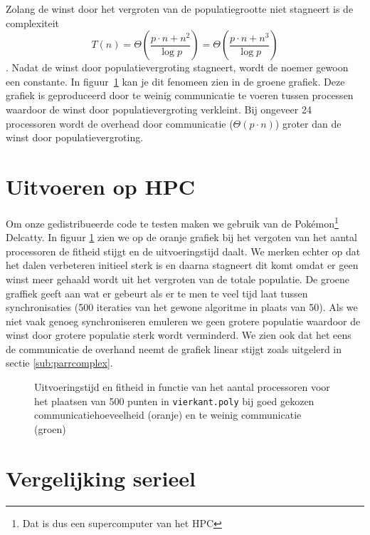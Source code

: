 Zolang de winst door het vergroten van de populatiegrootte niet stagneert is de complexiteit  \[T(n)=\Theta\left(\frac{p\cdot n + n^2}{\log{p}}\right) = \Theta\left(\frac{p\cdot n + n^3}{\log{p}}\right)\]. Nadat de winst door populatievergroting stagneert, wordt de noemer gewoon een constante. In figuur~\ref{delcaty} kan je dit fenomeen zien in de groene grafiek. Deze grafiek is geproduceerd door te weinig communicatie te voeren tussen processen waardoor de winst door populatievergroting verkleint. Bij ongeveer 24 processoren wordt de overhead door communicatie ($\Theta(p\cdot n)$) groter dan de winst door populatievergroting.

\section{Uitvoeren op HPC}
Om onze gedistribueerde code te testen maken we gebruik van de Pokémon\footnote{Dat is dus een supercomputer van het HPC} Delcatty. In figuur \ref{delcaty} zien we op de oranje grafiek bij het vergoten van het aantal processoren de fitheid stijgt en de uitvoeringstijd daalt. We merken echter op dat het dalen verbeteren initieel sterk is en daarna stagneert dit komt omdat er geen winst meer gehaald wordt uit het vergroten van de totale populatie. De groene graffiek geeft aan wat er gebeurt als er te men te veel tijd laat tussen synchronisaties (500 iteraties van het gewone algoritme in plaats van 50). Als we niet vaak genoeg synchroniseren emuleren we geen grotere populatie waardoor de winst door grotere populatie sterk wordt verminderd. We zien ook dat het eens de communicatie de overhand neemt de grafiek linear stijgt zoals uitgelerd in sectie \ref{sub:parrcomplex}.

\begin{figure}[H]


\caption{Uitvoeringstijd en fitheid in functie van het aantal processoren voor het plaatsen van 500 punten in \texttt{vierkant.poly} bij goed gekozen communicatiehoeveelheid (oranje) en te weinig communicatie (groen)}
\label{delcaty}
\end{figure}

\section{Vergelijking serieel}

